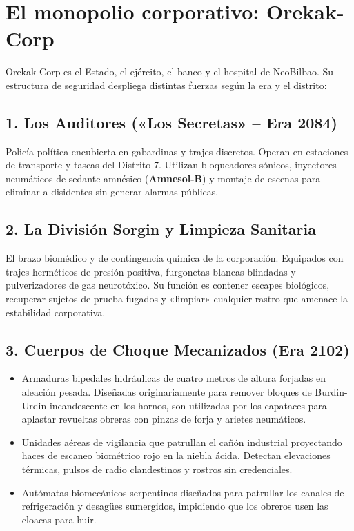 \section{El monopolio corporativo: Orekak-Corp}

Orekak-Corp es el Estado, el ejército, el banco y el hospital de NeoBilbao. Su estructura de seguridad despliega distintas fuerzas según la era y el distrito:

\subsection{1. Los Auditores («Los Secretas» -- Era 2084)}
Policía política encubierta en gabardinas y trajes discretos. Operan en estaciones de transporte y tascas del Distrito 7. Utilizan bloqueadores sónicos, inyectores neumáticos de sedante amnésico (\textbf{Amnesol-B}) y montaje de escenas para eliminar a disidentes sin generar alarmas públicas.

\subsection{2. La División Sorgin y Limpieza Sanitaria}
El brazo biomédico y de contingencia química de la corporación. Equipados con trajes herméticos de presión positiva, furgonetas blancas blindadas y pulverizadores de gas neurotóxico. Su función es contener escapes biológicos, recuperar sujetos de prueba fugados y «limpiar» cualquier rastro que amenace la estabilidad corporativa.

\subsection{3. Cuerpos de Choque Mecanizados (Era 2102)}

\begin{itemize}
  \item {} Armaduras bipedales hidráulicas de cuatro metros de altura forjadas en aleación pesada. Diseñadas originariamente para remover bloques de Burdin-Urdin incandescente en los hornos, son utilizadas por los capataces para aplastar revueltas obreras con pinzas de forja y arietes neumáticos.
  \item {} Unidades aéreas de vigilancia que patrullan el cañón industrial proyectando haces de escaneo biométrico rojo en la niebla ácida. Detectan elevaciones térmicas, pulsos de radio clandestinos y rostros sin credenciales.
  \item {} Autómatas biomecánicos serpentinos diseñados para patrullar los canales de refrigeración y desagües sumergidos, impidiendo que los obreros usen las cloacas para huir.
\end{itemize}

